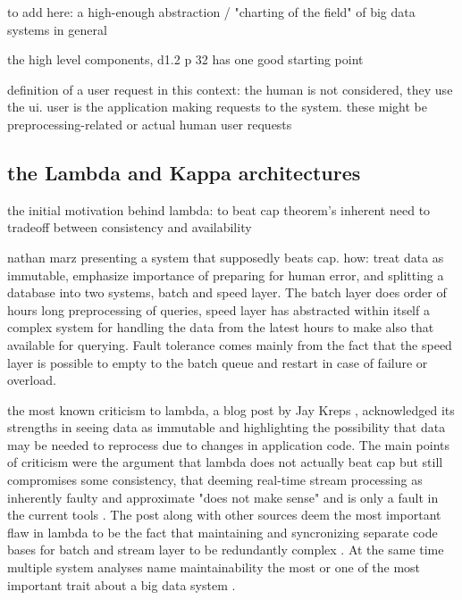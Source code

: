 to add here: a high-enough abstraction / "charting of the field" of big data systems in general

the high level components, d1.2 p 32 has one good starting point

definition of a user request in this context: the human is not considered, they use the ui. user is the application making requests to the system. these might be preprocessing-related or actual human user requests

\subsection{the Lambda and Kappa architectures}


the initial motivation behind lambda: to beat cap theorem's inherent need to tradeoff between consistency and availability \cite{lambdakappa}

nathan marz presenting a system that supposedly beats cap. how: treat data as immutable, emphasize importance of preparing for human error, and splitting a database into two systems, batch and speed layer. The batch layer does order of hours long preprocessing of queries, speed layer has  abstracted within itself a complex system for handling the data from the latest hours to make also that available for querying. Fault tolerance comes mainly from the fact that the speed layer is possible to empty to the batch queue and restart in case of failure or overload.

the most known criticism to lambda, a blog post by Jay Kreps \cite{questioninglambda}, acknowledged its strengths in seeing data as immutable and highlighting the possibility that data may be needed to reprocess due to changes in application code. The main points of criticism were the argument that lambda does not actually beat cap but still compromises some consistency, that deeming real-time stream processing as inherently faulty and approximate "does not make sense" and is only a fault in the current tools \cite{questioninglambda}. The post along with other sources deem the most important flaw in lambda to be the fact that maintaining and syncronizing separate code bases for batch and stream layer to be redundantly complex \cite{uber} \cite{facebook}. At the same time multiple system analyses name maintainability the most or one of the most important trait about a big data system \cite{facebook} \cite{storm@twitter}.

